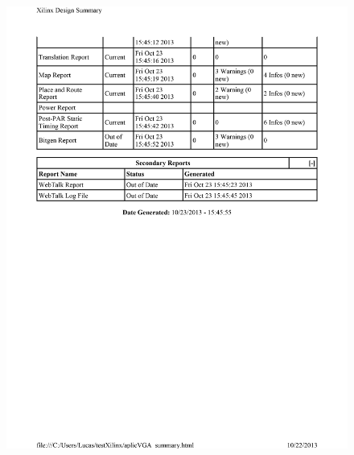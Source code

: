 \documentclass{article}
\begin{document}
\begin{figure}[h!]
  \centering
	\includegraphics[scale=0.7]{aplicVGA_summary-2.png}\\[1cm] 
\end{figure}
\end{document}
